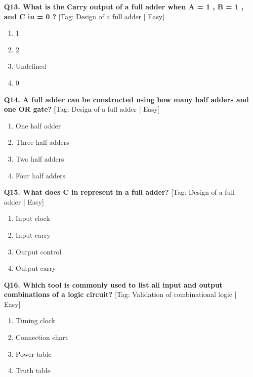 \noindent\textbf{Q13. What is the Carry output of a full adder when A = 1 , B = 1 , and C in = 0 ?} \hfill [Tag: Design of a full adder | Easy]
\begin{enumerate}[label=(\alph*),topsep=2pt,itemsep=1pt,partopsep=0pt,parsep=0pt]
    \item {1}
    \item {2}
    \item {Undefined}
    \item {0}
\end{enumerate}
\vspace{2mm}

\noindent\textbf{Q14. A full adder can be constructed using how many half adders and one OR gate?} \hfill [Tag: Design of a full adder | Easy]
\begin{enumerate}[label=(\alph*),topsep=2pt,itemsep=1pt,partopsep=0pt,parsep=0pt]
    \item {One half adder}
    \item {Three half adders}
    \item {Two half adders}
    \item {Four half adders}
\end{enumerate}
\vspace{2mm}

\noindent\textbf{Q15. What does C in represent in a full adder?} \hfill [Tag: Design of a full adder | Easy]
\begin{enumerate}[label=(\alph*),topsep=2pt,itemsep=1pt,partopsep=0pt,parsep=0pt]
    \item {Input clock}
    \item {Input carry}
    \item {Output control}
    \item {Output carry}
\end{enumerate}
\vspace{2mm}

\noindent\textbf{Q16. Which tool is commonly used to list all input and output combinations of a logic circuit?} \hfill [Tag: Validation of combinational logic | Easy]
\begin{enumerate}[label=(\alph*),topsep=2pt,itemsep=1pt,partopsep=0pt,parsep=0pt]
    \item {Timing clock}
    \item {Connection chart}
    \item {Power table}
    \item {Truth table}
\end{enumerate}
\vspace{2mm}

